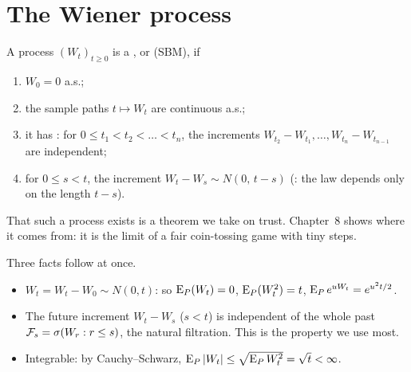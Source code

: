 \begin{pic}
\end{pic}

\section{The Wiener process}

\begin{definition}
\label{def:wiener}
A process $(W_t)_{t\ge0}$ is a , or  (SBM), if
\begin{enumerate}[label=(\arabic*)]
  \item $W_0=0$ a.s.;
  \item the sample paths $t\mapsto W_t$ are continuous a.s.;
  \item it has : for $0\le t_1<t_2<\dots<t_n$, the increments $W_{t_2}-W_{t_1},\dots,W_{t_n}-W_{t_{n-1}}$ are independent;
  \item for $0\le s<t$, the increment $W_t-W_s\sim N(0,\,t-s)$ (: the law depends only on the length $t-s$).
\end{enumerate}
\end{definition}

That such a process exists is a theorem we take on trust. Chapter~8 shows where it comes from: it is the limit of a fair coin-tossing game with tiny steps.

Three facts follow at once.
\begin{itemize}
  \item $W_t=W_t-W_0\sim N(0,t)$: so $\operatorname{E}_P(W_t)=0$, $\operatorname{E}_P(W_t^2)=t$, $\operatorname{E}_Pe^{uW_t}=e^{u^2t/2}$.
  \item The future increment $W_t-W_s$ ($s<t$) is independent of the whole past $\mathcal F_s=\sigma(W_r:r\le s)$, the natural filtration. This is the property we use most.
  \item Integrable: by Cauchy--Schwarz, $\operatorname{E}_P|W_t|\le\sqrt{\operatorname{E}_PW_t^2}=\sqrt t<\infty$.
\end{itemize}

